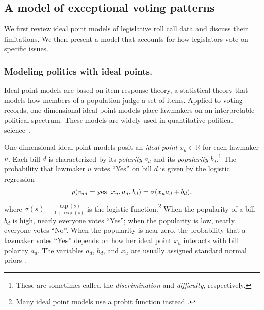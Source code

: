 \subsection{A model of exceptional voting patterns}
\label{section:exceptional_model}

We first review ideal point models of legislative roll call data and discuss
their limitations.  We then present a model that accounts for how
legislators vote on specific issues.

\subsubsection{Modeling politics with ideal points.}

Ideal point models are based on item response theory, a statistical
theory that models how members of a population judge a set of items.
Applied to voting records, one-dimensional ideal point models place
lawmakers on an interpretable political spectrum.  These models are
widely used in quantitative political
science~\citep{clinton:2004,poole:1985,martin:2002}.


One-dimensional ideal point models posit an \textit{ideal point} $x_u
\in \mathbb{R}$ for each lawmaker $u$.  Each bill $d$ is characterized
by its \textit{polarity} $a_d$ and its \textit{popularity} $b_d$.\footnote{These are sometimes called the \emph{discrimination} and \emph{difficulty}, respectively.}  The
probability that lawmaker $u$ votes ``Yes'' on bill $d$ is given by
the logistic regression
\begin{equation}
  \label{eq:trad_ipm}
  p(v_{ud} = \textrm{yes} \, | \, x_u, a_d, b_d) =
  \sigma(x_u a_d + b_d),
\end{equation}
where $\sigma(s) = \frac{\exp(s)}{1 + \exp(s)}$ is the logistic
function.\footnote{Many ideal point models use a probit function instead \cite{poole:1991,clinton:2004}.}
When the popularity of a bill $b_d$ is high, nearly everyone votes
``Yes''; when the popularity is low, nearly everyone votes ``No''.
When the popularity is near zero, the probability that a lawmaker
votes ``Yes'' depends on how her ideal point $x_u$ interacts
with bill polarity $a_d$.  The variables $a_d$, $b_d$, and $x_u$ are
usually assigned standard normal priors \cite{clinton:2004}.

